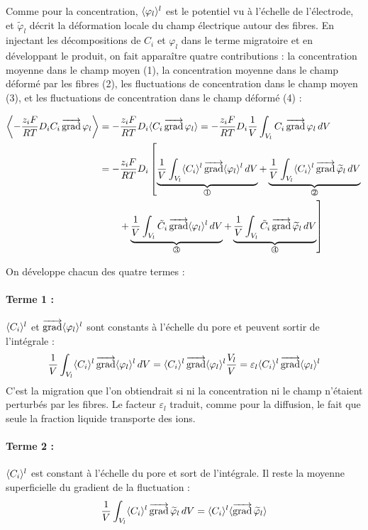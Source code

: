 Comme pour la concentration, $\langle \varphi_l \rangle^l$ est le potentiel vu à
l'échelle de l'électrode, et $\tilde{\varphi}_l$ décrit la déformation locale
du champ électrique autour des fibres. En injectant les décompositions de
$C_i$ et $\varphi_l$ dans le terme migratoire et en développant le produit, on
fait apparaître quatre contributions : la concentration moyenne dans le champ
moyen (1), la concentration moyenne dans le champ déformé par les fibres (2),
les fluctuations de concentration dans le champ moyen (3), et les fluctuations
de concentration dans le champ déformé (4) :

\begin{align}
\left\langle -\frac{z_i F}{RT} D_i C_i \Grad\varphi_l \right\rangle
&= -\frac{z_i F}{RT} D_i \avg{C_i \Grad\varphi_l}
= -\frac{z_i F}{RT} D_i \frac{1}{V}\int_{V_l} C_i \Grad\varphi_l\, dV \notag\\
&= -\frac{z_i F}{RT} D_i
\left[
\underbrace{\frac{1}{V}\int_{V_l} \avg{C_i}^l \Grad\avg{\varphi_l}^l\, dV}_{\circled{1}}
+ \underbrace{\frac{1}{V}\int_{V_l} \avg{C_i}^l \Grad\widetilde{\varphi}_l\, dV}_{\circled{2}}
\right. \notag\\
&\quad\quad\left.
+ \underbrace{\frac{1}{V}\int_{V_l} \tilde{C}_i \Grad\avg{\varphi_l}^l\, dV}_{\circled{3}}
+ \underbrace{\frac{1}{V}\int_{V_l} \tilde{C}_i \Grad\widetilde{\varphi}_l\, dV}_{\circled{4}}
\right]
\end{align}

On développe chacun des quatre termes :

\paragraph{Terme 1 :}
$\langle C_i \rangle^l$ et $\mathop{\overrightarrow{\operatorname{grad}}}\nolimits\langle \varphi_l \rangle^l$ sont constants à l'échelle du pore
et peuvent sortir de l'intégrale :
\begin{equation}
\frac{1}{V}\int_{V_l} \langle C_i \rangle^l \mathop{\overrightarrow{\operatorname{grad}}}\nolimits\langle \varphi_l \rangle^l\, dV
= \langle C_i \rangle^l \mathop{\overrightarrow{\operatorname{grad}}}\nolimits\langle \varphi_l \rangle^l \frac{V_l}{V}
= \varepsilon_l \langle C_i \rangle^l \mathop{\overrightarrow{\operatorname{grad}}}\nolimits\langle \varphi_l \rangle^l
\end{equation}
C'est la migration que l'on obtiendrait si ni la concentration ni le champ
n'étaient perturbés par les fibres. Le facteur $\varepsilon_l$ traduit, comme
pour la diffusion, le fait que seule la fraction liquide transporte des ions.

\paragraph{Terme 2 :}
$\langle C_i \rangle^l$ est constant à l'échelle du pore et sort de l'intégrale.
Il reste la moyenne superficielle du gradient de la fluctuation :
\begin{equation}
\frac{1}{V}\int_{V_l} \langle C_i \rangle^l \mathop{\overrightarrow{\operatorname{grad}}}\nolimits\widetilde{\varphi}_l\, dV
= \langle C_i \rangle^l \langle \mathop{\overrightarrow{\operatorname{grad}}}\nolimits\widetilde{\varphi}_l \rangle
\end{equation}

